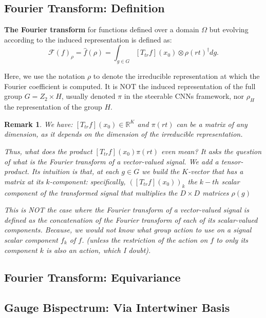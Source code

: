 \documentclass{article}
\newtheorem{remark}{Remark}
\begin{document}
\subsection{Fourier Transform: Definition}

\textbf{The Fourier transform} for functions defined over a domain $\Omega$ but evolving according to the induced representation is defined as:
\begin{equation}
\mathcal{F}(f)_\rho = \widehat{f}(\rho ) = \int_{g \in G} \left[T_{t r} f\right](x_0) \otimes \rho(rt)^\dagger dg.
\end{equation}

Here, we use the notation $\rho$ to denote the irreducible representation at which the Fourier coefficient is computed. It is NOT the induced representation of the full group $G = Z_2 \times H$, usually denoted $\pi$ in the steerable CNNs framework, nor $\rho_H$ the representation of the group $H$.

\begin{remark}
We have: $\left[T_{t r} f\right](x_0) \in \mathbb{R}^K$ and $\pi(rt)$ can be a matrix of any dimension, as it depends on the dimension of the irreducible representation.

Thus, what does the product $ \left[T_{t r} f\right](x_0)\pi(rt)$ even mean? It asks the question of what is the Fourier transform of a vector-valued signal. We add a tensor-product. Its intuition is that, at each $g \in G$ we build the $K$-vector that has a matrix at its $k$-component: specifically, $\left(\left[T_{t r} f\right](x_0)\right)_k$ the $k-th$ scalar component of the transformed signal that multiplies the $D \times D$ matrices $\rho(g)$

This is NOT the case where the Fourier transform of a vector-valued signal is defined as the concatenation of the Fourier transform of each of its scalar-valued components. Because, we would not know what group action to use on a signal scalar component $f_k$ of $f$. (unless the restriction of the action on $f$ to only its component $k$ is also an action, which I doubt).
\end{remark}


\subsection{Fourier Transform: Equivariance}


\subsection{Gauge Bispectrum: Via Intertwiner Basis}
\end{document}
